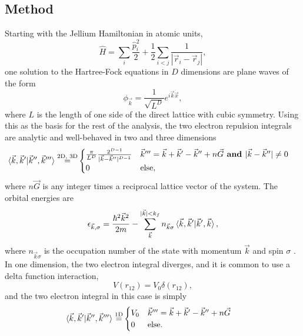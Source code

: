 \documentclass{revtex4}
\begin{document}
  \subsection{Method}

	Starting with the Jellium Hamiltonian in atomic units, 
	\begin{equation}\label{hamiltonian}
		\hat{H} = \sum_i \frac{\hat{p}_i^2}{2}  + \frac{1}{2} \sum_{i < j} \frac{1}{|\vec{r}_i - 
		\vec{r}_j|},
	\end{equation}
	one solution to the Hartree-Fock equations in $D$ dimensions are plane waves of the form	
	\begin{equation}\label{planewave}
		\phi_{\vec{k}} =
		   \frac{1} { \sqrt{L ^ D} } e ^ {i \vec{k} \dot \vec{x}},
	\end{equation}
	where $L$ is the length of one side of the direct lattice with cubic symmetry. Using this as the 
	basis for the rest of the analysis, the two electron repulsion integrals are analytic and 
	well-behaved in two and three dimensions\cite{Delyon2008, Guiliani2005}
  \begin{align}
   	\braket{\vec{k}, \vec{k}' | \vec{k}'', \vec{k}'''} 
  	  \stackrel{ \text{2D, 3D} }{=}&
   	\begin{cases} 
   	\frac{\pi} {L ^ D} \frac{ 2^{D-1} } { | \vec{k} - \vec{k}'' | ^ {D-1} } 
   	& \vec{k}''' = \vec{k} + \vec{k}' - \vec{k}'' + n\vec{G} \textbf{ and } | \vec{k} - 
   	\vec{k}''| \neq 0 \\
   	0 
   	& \text{else},
   	\end{cases}
  \end{align}
  where $n\vec{G}$ is any integer times a reciprocal 
  lattice vector of the 
  system. The orbital energies are
  \begin{equation}\label{eq:hf_orb_energy}
  \epsilon_{\vec{k},\sigma}=
  \frac{\hbar^2\vec{k}^2}{2m} - \sum\limits_{\vec{k}}^{|\vec{k}|< 
  k_f}n_{\vec{k}\sigma}\braket{\vec{k}, \vec{k}' |\vec{k}', \vec{k}},
  \end{equation}
  where $n_{\vec{k}\sigma}$ is the occupation number of the state with momentum $\vec{k}$ and 
  spin $\sigma$ \cite{Guiliani2005}. In one dimension, the two electron integral diverges, and it 
  is common to use a delta function interaction, 
  \begin{equation}
    V(r_{12}) = V_0\delta(r_{12}),
  \end{equation}
  and the two electron integral in this case is simply
  \begin{align}
   	\braket{\vec{k}, \vec{k}' | \vec{k}'', \vec{k}'''} 
  	  \stackrel{ \text{1D} }{=}&
   	\begin{cases} 
   	V_0 
   	& \vec{k}''' = \vec{k} + \vec{k}' - \vec{k}'' + n\vec{G}\\
   	0 
   	& \text{else}.
   	\end{cases}
  \end{align}  
    
\end{document}
